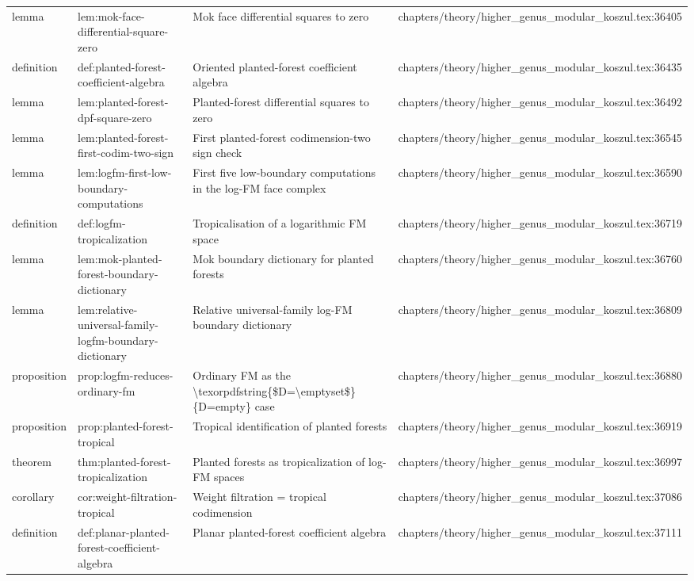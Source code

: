 \documentclass[11pt]{article}
\begin{document}
\begin{longtable}{L{0.10\textwidth}L{0.26\textwidth}L{0.42\textwidth}L{0.22\textwidth}}
lemma & lem:mok-face-differential-square-zero & Mok face differential squares to zero & chapters/theory/higher\_genus\_modular\_koszul.tex:36405\\
definition & def:planted-forest-coefficient-algebra & Oriented planted-forest coefficient algebra & chapters/theory/higher\_genus\_modular\_koszul.tex:36435\\
lemma & lem:planted-forest-dpf-square-zero & Planted-forest differential squares to zero & chapters/theory/higher\_genus\_modular\_koszul.tex:36492\\
lemma & lem:planted-forest-first-codim-two-sign & First planted-forest codimension-two sign check & chapters/theory/higher\_genus\_modular\_koszul.tex:36545\\
lemma & lem:logfm-first-low-boundary-computations & First five low-boundary computations in the log-FM face complex & chapters/theory/higher\_genus\_modular\_koszul.tex:36590\\
definition & def:logfm-tropicalization & Tropicalisation of a logarithmic FM space & chapters/theory/higher\_genus\_modular\_koszul.tex:36719\\
lemma & lem:mok-planted-forest-boundary-dictionary & Mok boundary dictionary for planted forests & chapters/theory/higher\_genus\_modular\_koszul.tex:36760\\
lemma & lem:relative-universal-family-logfm-boundary-dictionary & Relative universal-family log-FM boundary dictionary & chapters/theory/higher\_genus\_modular\_koszul.tex:36809\\
proposition & prop:logfm-reduces-ordinary-fm & Ordinary FM as the \textbackslash{}texorpdfstring\{\$D=\textbackslash{}emptyset\$\}\{D=empty\} case & chapters/theory/higher\_genus\_modular\_koszul.tex:36880\\
proposition & prop:planted-forest-tropical & Tropical identification of planted forests & chapters/theory/higher\_genus\_modular\_koszul.tex:36919\\
theorem & thm:planted-forest-tropicalization & Planted forests as tropicalization of log-FM spaces & chapters/theory/higher\_genus\_modular\_koszul.tex:36997\\
corollary & cor:weight-filtration-tropical & Weight filtration = tropical codimension & chapters/theory/higher\_genus\_modular\_koszul.tex:37086\\
definition & def:planar-planted-forest-coefficient-algebra & Planar planted-forest coefficient algebra & chapters/theory/higher\_genus\_modular\_koszul.tex:37111\\

\end{longtable}
\end{document}
